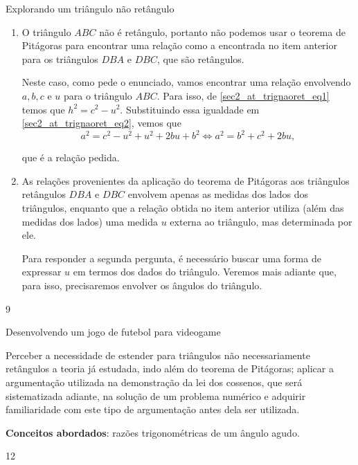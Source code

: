 \begin{answer}{Explorando um triângulo não retângulo}
{\begin{enumerate}
    \item{}
    O triângulo $ABC$ não é retângulo, portanto não podemos usar o teorema de Pitágoras para encontrar uma relação como a encontrada no item anterior para os triângulos $DBA$ e $DBC$, que são retângulos. 
    
    Neste caso, como pede o enunciado, vamos encontrar uma relação envolvendo $a, b, c$ e $u$ para o triângulo $ABC$. Para isso, de \eqref{sec2_at_trignaoret_eq1} temos que $h^2=c^2-u^2$. Substituindo essa igualdade em \eqref{sec2_at_trignaoret_eq2}, vemos que
    $$a^2=c^2-u^2+u^2+2bu+b^2 \iff a^2=b^2+c^2+2bu,$$
    
    que é a relação pedida.
    
    \item{}
    As relações provenientes da aplicação do teorema de Pitágoras aos triângulos retângulos $DBA$ e $DBC$ envolvem apenas as medidas dos lados dos triângulos, enquanto que a relação obtida no item anterior utiliza (além das medidas dos lados) uma medida $u$ externa ao triângulo, mas determinada por ele. 
    
    Para responder a segunda pergunta, é necessário buscar uma forma de expressar $u$ em termos dos dados do triângulo. Veremos mais adiante que, para isso, precisaremos envolver os ângulos do triângulo. 
\end{enumerate}
}{9}
\end{answer}
\clearmargin
\begin{objectives}{Desenvolvendo um jogo de futebol para videogame}
{
Perceber a necessidade de estender para triângulos não necessariamente retângulos a teoria já estudada, indo além do teorema de Pitágoras; aplicar a argumentação utilizada na demonstração da lei dos cossenos, que será sistematizada adiante, na solução de um problema numérico e adquirir familiaridade com este tipo de argumentação antes dela ser utilizada.  

\textbf{Conceitos abordados}: razões trigonométricas de um ângulo agudo.
}{1}{2}
\end{objectives}
